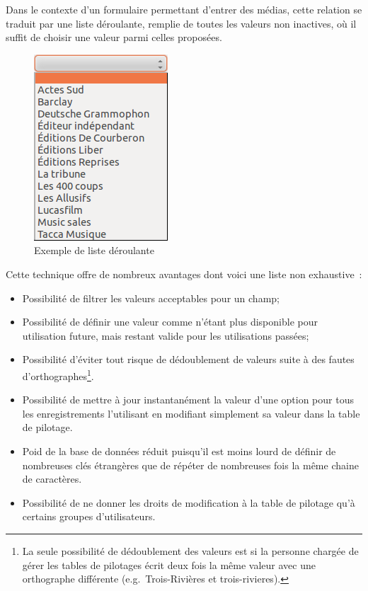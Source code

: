 \documentclass[letter, 11pt]{report}
\begin{document}
Dans le contexte d'un formulaire permettant d'entrer des médias, cette relation se traduit par une liste déroulante, remplie de toutes les valeurs non inactives, où il suffit de choisir une valeur parmi celles proposées.

\begin{figure}[htbp]
	\begin{center}
		\includegraphics[scale=0.5]{exempleListeDeroulante.png}
	\end{center}
	\caption{Exemple de liste déroulante}
\end{figure}

Cette technique offre de nombreux avantages dont voici une liste non exhaustive~:
\begin{itemize}
	\item Possibilité de filtrer les valeurs acceptables pour un champ;
	\item Possibilité de définir une valeur comme n'étant plus disponible pour utilisation future, mais restant valide pour les utilisations passées;
	\item Possibilité d'éviter tout risque de dédoublement de valeurs suite à des fautes d'orthographes\footnote{La seule possibilité de dédoublement des valeurs est si la personne chargée de gérer les tables de pilotages écrit deux fois la même valeur avec une orthographe différente (e.g.\ Trois-Rivières et trois-rivieres).}.
	\item Possibilité de mettre à jour instantanément la valeur d'une option pour tous les enregistrements l'utilisant en modifiant simplement sa valeur dans la table de pilotage.
	\item Poid de la base de données réduit puisqu'il est moins lourd de définir de nombreuses clés étrangères que de répéter de nombreuses fois la même chaine de caractères.
	\item Possibilité de ne donner les droits de modification à la table de pilotage qu'à certains groupes d'utilisateurs.
\end{itemize}
\end{document}
